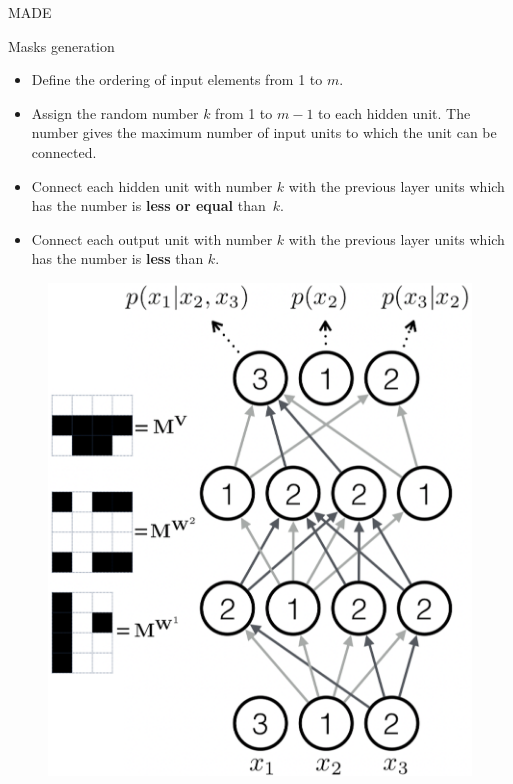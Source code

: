 \begin{frame}{MADE}
		\begin{minipage}[t]{0.65\columnwidth}
		    \vspace{-0.5cm}
			\begin{block}{Masks generation}
				\begin{itemize}
					\item Define the ordering of input elements from 1 to $m$.
					\item Assign the random number $k$ from 1 to $m - 1$ to each hidden unit. The number gives the
					maximum number of input units to which the unit can be connected.
					\item Connect each hidden unit with number $k$ with the previous layer units which has the number is \textbf{less or equal} than~$k$.
					\item Connect each output unit with number $k$ with the previous layer units which has the number is \textbf{less} than $k$.
				\end{itemize}
			\end{block}
		\end{minipage}%
		\begin{minipage}[t]{0.33\columnwidth}
			\vspace{2cm}
			\begin{figure}
				\centering
				\includegraphics[width=1.0\linewidth]{figs/made2}
			\end{figure}
		\end{minipage}
\end{frame}
